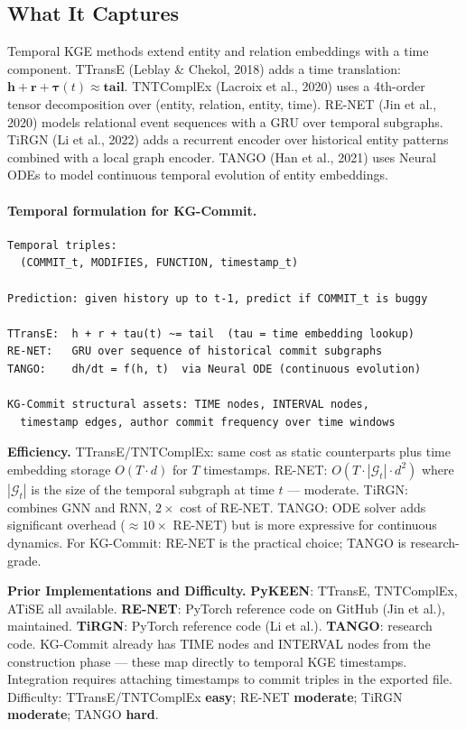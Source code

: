\documentclass[12pt,a4paper]{article}
\begin{document}
\subsection{What It Captures}

Temporal KGE methods extend entity and relation embeddings with a time component.
TTransE (Leblay \& Chekol, 2018) adds a time translation: $\mathbf{h} + \mathbf{r}
+ \boldsymbol{\tau}(t) \approx \mathbf{tail}$. TNTComplEx (Lacroix et al., 2020)
uses a 4th-order tensor decomposition over (entity, relation, entity, time).
RE-NET (Jin et al., 2020) models relational event sequences with a GRU over
temporal subgraphs. TiRGN (Li et al., 2022) adds a recurrent encoder over
historical entity patterns combined with a local graph encoder. TANGO (Han et al.,
2021) uses Neural ODEs to model continuous temporal evolution of entity embeddings.

\paragraph{Temporal formulation for KG-Commit.}
\begin{lstlisting}
Temporal triples:
  (COMMIT_t, MODIFIES, FUNCTION, timestamp_t)

Prediction: given history up to t-1, predict if COMMIT_t is buggy

TTransE:  h + r + tau(t) ~= tail  (tau = time embedding lookup)
RE-NET:   GRU over sequence of historical commit subgraphs
TANGO:    dh/dt = f(h, t)  via Neural ODE (continuous evolution)

KG-Commit structural assets: TIME nodes, INTERVAL nodes,
  timestamp edges, author commit frequency over time windows
\end{lstlisting}

\begin{effbox}
\textbf{Efficiency.}
TTransE/TNTComplEx: same cost as static counterparts plus time embedding
storage $O(T \cdot d)$ for $T$ timestamps. RE-NET: $O(T \cdot |\mathcal{G}_t|
\cdot d^2)$ where $|\mathcal{G}_t|$ is the size of the temporal subgraph at
time $t$ --- moderate. TiRGN: combines GNN and RNN, $2\times$ cost of RE-NET.
TANGO: ODE solver adds significant overhead ($\approx10\times$ RE-NET) but is
more expressive for continuous dynamics. For KG-Commit: RE-NET is the
practical choice; TANGO is research-grade.
\end{effbox}

\begin{implbox}
\textbf{Prior Implementations and Difficulty.}
\textbf{PyKEEN}: TTransE, TNTComplEx, ATiSE all available.
\textbf{RE-NET}: PyTorch reference code on GitHub (Jin et al.), maintained.
\textbf{TiRGN}: PyTorch reference code (Li et al.).
\textbf{TANGO}: research code.
KG-Commit already has TIME nodes and INTERVAL nodes from the construction
phase --- these map directly to temporal KGE timestamps. Integration requires
attaching timestamps to commit triples in the exported file.
Difficulty: TTransE/TNTComplEx \textbf{easy}; RE-NET \textbf{moderate};
TiRGN \textbf{moderate}; TANGO \textbf{hard}.
\end{implbox}
\end{document}
